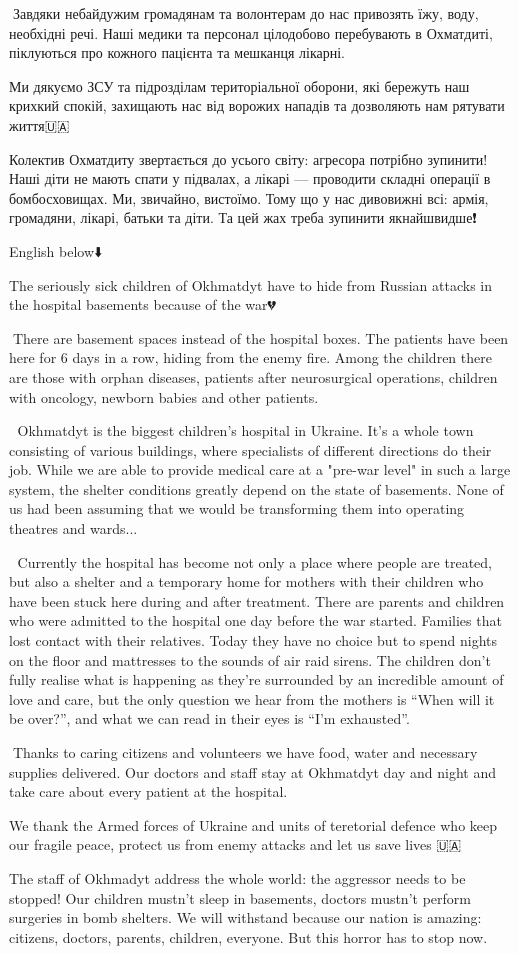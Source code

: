 🔻Завдяки небайдужим громадянам та волонтерам до нас привозять їжу, воду,
необхідні речі. Наші медики та персонал цілодобово перебувають в Охматдиті,
піклуються про кожного пацієнта та мешканця лікарні.

Ми дякуємо ЗСУ та підрозділам територіальної оборони, які бережуть наш крихкий
спокій, захищають нас від ворожих нападів та дозволяють нам рятувати життя🇺🇦

Колектив Охматдиту звертається до усього світу: агресора потрібно зупинити!
Наші діти не мають спати у підвалах, а лікарі — проводити складні операції в
бомбосховищах. Ми, звичайно, вистоїмо. Тому що у нас дивовижні всі: армія,
громадяни, лікарі, батьки та діти. Та цей жах треба зупинити якнайшвидше❗️

English below⬇️

The seriously sick children of Okhmatdyt have to hide from Russian attacks in
the hospital basements because of the war💔

🔻There are basement spaces instead of the hospital boxes. The patients have
been here for 6 days in a row, hiding from the enemy fire. Among the children
there are those with orphan diseases, patients after neurosurgical operations,
children with oncology, newborn babies and other patients.

🔻 Okhmatdyt is the biggest children's hospital in Ukraine. It's a whole town
consisting of various buildings, where specialists of different directions do
their job. While we are able to provide medical care at a "pre-war level" in
such a large system, the shelter conditions greatly depend on the state of
basements. None of us had been assuming that we would be transforming them into
operating theatres and wards...

🔻 Currently the hospital has become not only a place where people are treated,
but also a shelter and a temporary home for mothers with their children who
have been stuck here during and after treatment. There are parents and children
who were admitted to the hospital one day before the war started. Families that
lost contact with their relatives. Today they have no choice but to spend
nights on the floor and mattresses to the sounds of air raid sirens. The
children don't fully realise what is happening as they're surrounded by an
incredible amount of love and care, but the only question we hear from the
mothers is \enquote{When will it be over?}, and what we can read in their eyes is \enquote{I'm
exhausted}.

🔻Thanks to caring citizens and volunteers we have food, water and necessary
supplies delivered. Our doctors and staff stay at Okhmatdyt day and night and
take care about every patient at the hospital.

We thank the Armed forces of Ukraine and units of teretorial defence who keep
our fragile peace, protect us from enemy attacks and let us save lives 🇺🇦

The staff of Okhmadyt address the whole world: the aggressor needs to be
stopped! Our children mustn't sleep in basements, doctors mustn't perform
surgeries in bomb shelters. We will withstand because our nation is amazing:
citizens, doctors, parents, children, everyone. But this horror has to stop
now.
